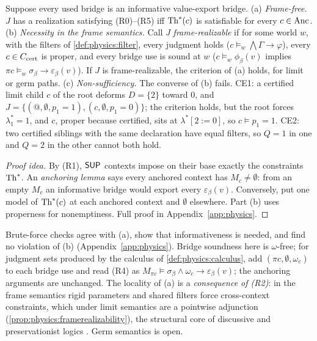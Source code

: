 \begin{theorem}\label{thm:physics:realizability}
Suppose every used bridge is an informative value-export bridge. \textup{(a)}
\emph{Frame-free.} $J$ has a realization satisfying (R0)--(R5) iff $\mathrm{Th}^*(c)$ is
satisfiable for every $c\in\mathrm{Anc}$. \textup{(b)} \emph{Necessity in the frame semantics.}
Call $J$ \emph{frame-realizable} if for some world $w$, with the filters of
\cref{def:physics:filter}, every judgment holds ($c\models_w\bigwedge\Gamma\to\varphi$),
every $c\in C_{\mathrm{cert}}$ is proper, and every bridge use is sound at $w$ ($c\models_w\phi_\beta(v)$
implies $\pi c\models_w\sigma_\beta\to\varepsilon_\beta(v)$). If $J$ is frame-realizable,
the criterion of (a) holds, for limit or germ paths. \textup{(c)} \emph{Non-sufficiency.}
The converse of (b) fails. CE1: a certified limit child $c$ of the root deforms $D=\{2\}$
toward $0$, and $J=\{(@,\emptyset,p_1=1),(c,\emptyset,p_1=0)\}$; the criterion holds, but the
root forces $\lambda^*_1=1$, and $c$, proper because certified, sits at
$\lambda^*[2{:=}0]$, so $c\models p_1=1$. CE2: two certified siblings with the same
declaration have equal filters, so $Q=1$ in one and $Q=2$ in the other cannot both hold.
\end{theorem}
\begin{proof}[Proof idea]
By (R1), $\mathsf{SUP}$ contexts impose on their base exactly the constraints $\mathrm{Th}^*$. An
\emph{anchoring lemma} says every anchored context has $M_c\neq\emptyset$: from an empty
$M_c$ an informative bridge would export every $\varepsilon_\beta(v)$. Conversely, put one
model of $\mathrm{Th}^*(c)$ at each anchored context and $\emptyset$ elsewhere. Part (b) uses
properness for nonemptiness. Full proof in Appendix~\ref{app:physics}.
\end{proof}

Brute-force checks agree with (a), show that informativeness is needed, and find no
violation of (b)  (Appendix~\ref{app:physics}). Bridge soundness here is
$\omega$-free; for judgment sets produced by the calculus of \cref{def:physics:calculus},
add $(\pi c,\emptyset,\omega_c)$ to each bridge use and read (R4) as
$M_{\pi c}\models\sigma_\beta\wedge\omega_c\to\varepsilon_\beta(v)$; the anchoring arguments
are unchanged. The locality of (a) is a \emph{consequence of (R2)}: in the frame semantics
rigid parameters and shared filters force cross-context constraints, which under limit
semantics are a pointwise adjunction (\cref{prop:physics:framerealizability}), the
structural core of discussive and preservationist logics
\citep{jaskowski1969propositional,schotch1980inference}. Germ semantics is open.

